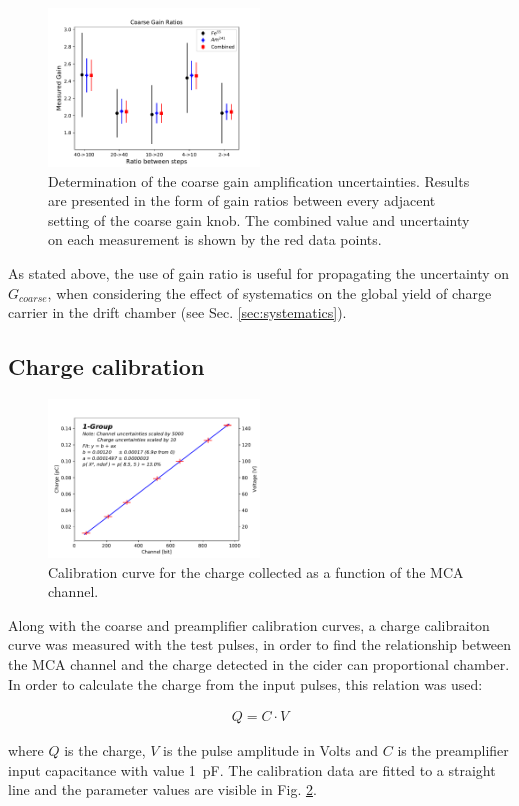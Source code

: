 \begin{figure}[htb]
  \includegraphics[width=0.5\textwidth]{graphics/coarse_gain_calibration.pdf}
  \caption{Determination of the coarse gain amplification uncertainties. Results are presented in the form of gain ratios between every adjacent setting of the coarse gain knob. The combined value and uncertainty on each measurement is shown by the red data points.}
  \label{fig:coarse_gain}
\end{figure}


As stated above, the use of gain ratio is useful for propagating the uncertainty on $G_{coarse}$, when considering the effect of systematics on the global yield of charge carrier in the drift chamber (see Sec. \ref{sec:systematics}).

\subsection{Charge calibration}

\begin{figure}[htb]
  \includegraphics[width=0.5\textwidth]{graphics/chargevschannel.pdf}
  \caption{Calibration curve for the charge collected as a function of the MCA channel.}
  \label{fig:charge_calibration}
\end{figure}

Along with the coarse and preamplifier calibration curves, a charge calibraiton curve was measured with the test pulses, in order to find the relationship between the MCA channel and the charge detected in the cider can proportional chamber. In order to calculate the charge from the input pulses, this relation was used:

\begin{align}
Q = C \cdot V
\end{align}

where $Q$ is the charge, $V$ is the pulse amplitude in Volts and $C$ is the preamplifier input capacitance with value \SI{1}{pF}.
The calibration data are fitted to a straight line and the parameter values are visible in Fig. \ref{fig:charge_calibration}.


